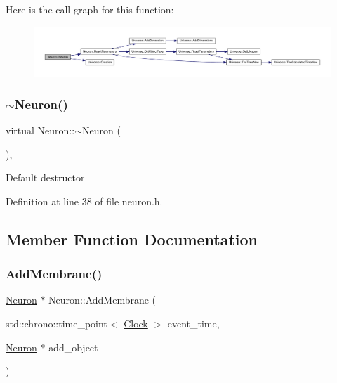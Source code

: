 Here is the call graph for this function\+:\nopagebreak
\begin{figure}[H]
\begin{center}
\leavevmode
\includegraphics[width=350pt]{class_neuron_a6839febd20fb8f776151e00142411a56_cgraph}
\end{center}
\end{figure}
\mbox{\label{class_neuron_aecd41febe74ef417230cd74af0c8b801}} 
\subsubsection{\texorpdfstring{$\sim$\+Neuron()}{~Neuron()}}
{\footnotesize\ttfamily virtual Neuron\+::$\sim$\+Neuron (\begin{DoxyParamCaption}{ }\end{DoxyParamCaption})\hspace{0.3cm}{\ttfamily [inline]}, {\ttfamily [virtual]}}

Default destructor 

Definition at line 38 of file neuron.\+h.



\subsection{Member Function Documentation}
\mbox{\label{class_neuron_a99d4b64f128e2bfbffec3c5d476a2ca3}} 
\subsubsection{\texorpdfstring{Add\+Membrane()}{AddMembrane()}}
{\footnotesize\ttfamily \mbox{\hyperlink{class_neuron}{Neuron}} $\ast$ Neuron\+::\+Add\+Membrane (\begin{DoxyParamCaption}\item[{std\+::chrono\+::time\+\_\+point$<$ \mbox{\hyperlink{universe_8h_a0ef8d951d1ca5ab3cfaf7ab4c7a6fd80}{Clock}} $>$}]{event\+\_\+time,  }\item[{\mbox{\hyperlink{class_neuron}{Neuron}} $\ast$}]{add\+\_\+object }\end{DoxyParamCaption})}



